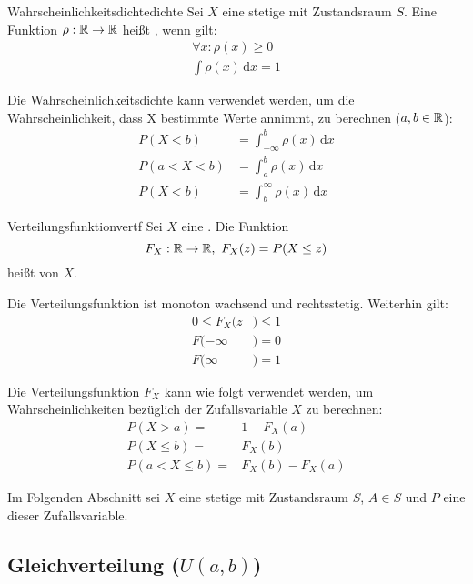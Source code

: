 \begin{definition}{Wahrscheinlichkeitsdichte}{dichte}
Sei $X$ eine stetige  mit Zustandsraum $S$.
Eine Funktion $\rho: \mathbb{R} \rightarrow \mathbb{R}$ heißt ,
wenn gilt:
\begin{align*}
  \forall x: \rho(x) \ge 0 \\
  \int \rho(x) \,\mathrm{d}x = 1
\end{align*}
\end{definition}

Die Wahrscheinlichkeitsdichte kann verwendet werden, um die Wahrscheinlichkeit,
dass X bestimmte Werte annimmt, zu berechnen ($a,b\in\mathbb{R}$):
\begin{align*}
  P(X < b) &= \int_{-\infty}^{b}\rho(x)\,\mathrm{d}x\\
  P(a<X<b) &= \int_{a}^{b}\rho(x)\,\mathrm{d}x\\
  P(X < b) &= \int^{\infty}_{b}\rho(x)\,\mathrm{d}x
\end{align*}

\begin{definition}{Verteilungsfunktion}{vertf}
Sei $X$ eine . Die Funktion
\[F_X:\mathbb{R}\to\mathbb{R},\ F_X(z) = P(X \le z)\]
heißt  von $X$.
\end{definition}

Die Verteilungsfunktion ist monoton wachsend und rechtsstetig. Weiterhin gilt:
\begin{align*}
0\le F_X(z&)\le 1 \\
F(-\infty&) = 0 \\
F(\infty&) = 1
\end{align*}

Die Verteilungsfunktion $F_X$ kann wie folgt verwendet werden, um
Wahrscheinlichkeiten bezüglich der Zufallsvariable $X$ zu berechnen:
\begin{align*}
P(X>a) = &1 - F_X(a) \\
P(X\le b) = &F_X(b) \\
P(a < X \le b) = &F_X(b) - F_X(a)
\end{align*}

Im Folgenden Abschnitt sei $X$ eine stetige 
mit Zustandsraum $S$, $A \in S$ und $P$ eine
 dieser Zufallsvariable.


\subsection{Gleichverteilung ($U(a,b)$)}
\label{vert-gleich}

